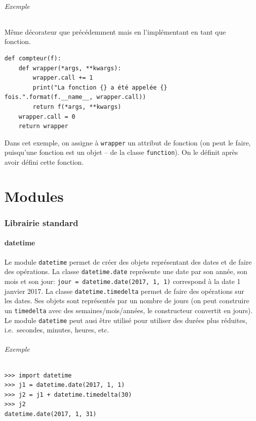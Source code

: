 \documentclass[a4paper, 10pt]{article}
\newcommand{\code}[1]{{\small\texttt{#1}}}
\begin{document}
\paragraph{Exemple} Même décorateur que précédemment mais en l'implémentant en tant que fonction.
\begin{verbatim}
def compteur(f):
    def wrapper(*args, **kwargs):
        wrapper.call += 1
        print("La fonction {} a été appelée {} fois.".format(f.__name__, wrapper.call))
        return f(*args, **kwargs)
    wrapper.call = 0
    return wrapper
\end{verbatim}

Dans cet exemple, on assigne à \code{wrapper} un attribut de fonction (on peut le faire, puisqu'une fonction est un objet -- de la classe \code{function}). On le définit après avoir défini cette fonction.
\part{Modules}
\section{Librairie standard}
\subsection{datetime}

Le module \code{datetime} permet de créer des objets représentant des dates et de faire des opérations. La classe \code{datetime.date} représente une date par son année, son mois et son jour: \code{jour = datetime.date(2017, 1, 1)} correspond à la date 1\ier{} janvier 2017.
La classe \code{datetime.timedelta} permet de faire des opérations sur les dates. Ses objets sont représentés par un nombre de jours (on peut construire un \code{timedelta} avec des semaines/mois/années, le constructeur convertit en jours).
Le module \code{datetime} peut ausi être utilisé pour utiliser des durées plus réduites, i.e.\ secondes, minutes, heures, etc.

\paragraph{Exemple}
\begin{Verbatim}[fontsize = \footnotesize, frame = single]
>>> import datetime
>>> j1 = datetime.date(2017, 1, 1)
>>> j2 = j1 + datetime.timedelta(30)
>>> j2
datetime.date(2017, 1, 31)
\end{Verbatim}
\end{document}
